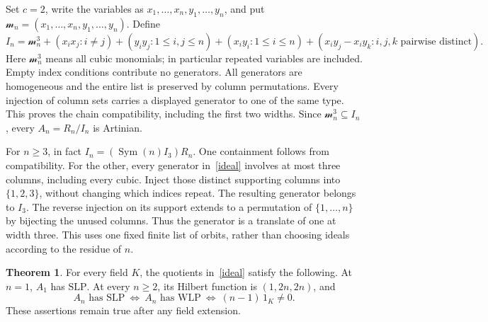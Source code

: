 \documentclass[11pt]{article}
\theoremstyle{definition}
\newtheorem{theorem}{Theorem}
\newcommand{\Sym}{\operatorname{Sym}}
\newcommand{\WLP}{\mathrm{WLP}}
\newcommand{\SLP}{\mathrm{SLP}}
\begin{document}
Set $c=2$, write the variables as $x_1,\ldots,x_n,y_1,\ldots,y_n$, and put
$\mathcal m_n=(x_1,\ldots,x_n,y_1,\ldots,y_n)$. Define
\begin{equation}\label{ideal}
 I_n=\mathcal m_n^3+
 (x_ix_j:i\ne j)+(y_iy_j:1\leq i,j\leq n)+(x_iy_i:1\leq i\leq n)
 +(x_iy_j-x_iy_k:i,j,k\text{ pairwise distinct}).
\end{equation}
Here $\mathcal m_n^3$ means all cubic monomials; in particular repeated
variables are included. Empty index conditions contribute no generators.
All generators are homogeneous and the entire list is preserved by column
permutations. Every injection of column sets carries a displayed generator
to one of the same type. This proves the chain compatibility, including
the first two widths. Since $\mathcal m_n^3\subseteq I_n$, every
$A_n=R_n/I_n$ is Artinian.

For $n\geq3$, in fact $I_n=(\Sym(n)I_3)R_n$.
One containment follows from compatibility. For the other, every generator
in~\eqref{ideal} involves at most three columns, including every cubic.
Inject those distinct supporting columns into $\{1,2,3\}$, without changing
which indices repeat. The resulting generator belongs to $I_3$.
The reverse injection on its support extends to a permutation of
$\{1,\ldots,n\}$ by bijecting the unused columns. Thus the generator is a
translate of one at width three. This uses one fixed finite list of orbits,
rather than choosing ideals according to the residue of $n$.

\begin{theorem}\label{main}
For every field $K$, the quotients in~\eqref{ideal} satisfy the following.
At $n=1$, $A_1$ has $\SLP$. At every $n\geq2$, its Hilbert function is
$(1,2n,2n)$, and
\[
 A_n\text{ has }\SLP
 \ \Longleftrightarrow\ A_n\text{ has }\WLP
 \ \Longleftrightarrow\ (n-1)\,1_K\ne0.
\]
These assertions remain true after any field extension.
\end{theorem}
\end{document}
